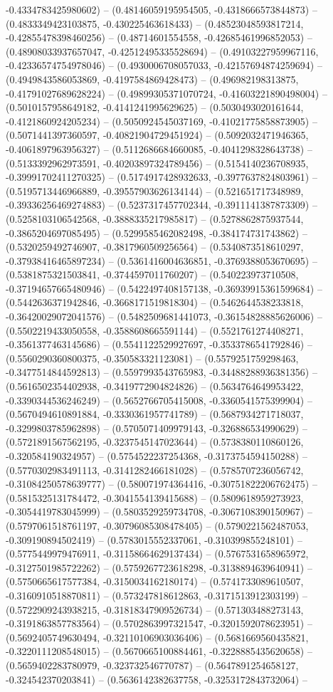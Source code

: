 -0.4334783425980602) -- (0.48146059195954505, -0.4318666573844873) -- (0.4833349423103875, -0.430225463618433) -- (0.48523048593817214, -0.42855478398460256) -- (0.48714601554558, -0.42685461996852053) -- (0.48908033937657047, -0.42512495335528694) -- (0.49103227959967116, -0.42336574754978046) -- (0.4930006708057033, -0.42157694874259694) -- (0.4949843586053869, -0.4197584869428473) -- (0.496982198313875, -0.41791027689628224) -- (0.49899305371070724, -0.41603221890498004) -- (0.5010157958649182, -0.4141241995629625) -- (0.5030493020161644, -0.4121860924205234) -- (0.5050924545037169, -0.41021775858873905) -- (0.5071441397360597, -0.40821904729451924) -- (0.5092032471946365, -0.4061897963956327) -- (0.5112686684660085, -0.4041298328643738) -- (0.5133392962973591, -0.40203897324789456) -- (0.5154140236708935, -0.39991702411270325) -- (0.5174917428932633, -0.3977637824803961) -- (0.5195713446966889, -0.39557903626134144) -- (0.521651717348989, -0.39336256469274883) -- (0.5237317457702344, -0.3911141387873309) -- (0.5258103106542568, -0.3888335217985817) -- (0.5278862875937544, -0.3865204697085495) -- (0.5299585462082498, -0.384174731743862) -- (0.5320259492746907, -0.3817960509256564) -- (0.5340873518610297, -0.37938416465897234) -- (0.5361416004636851, -0.3769388053670695) -- (0.5381875321503841, -0.3744597011760207) -- (0.540223973710508, -0.37194657665480946) -- (0.5422497408157138, -0.36939915361599684) -- (0.5442636371942846, -0.3668171519818304) -- (0.5462644538233818, -0.36420029072041576) -- (0.5482509681441073, -0.36154828885626006) -- (0.5502219433050558, -0.3588608665591144) -- (0.5521761274408271, -0.3561377463145686) -- (0.5541122529927697, -0.3533786541792846) -- (0.5560290360800375, -0.350583321123081) -- (0.5579251759298463, -0.3477514844592813) -- (0.5597993543765983, -0.34488288936381356) -- (0.5616502354402938, -0.3419772904824826) -- (0.5634764649953422, -0.3390344536246249) -- (0.5652766705415008, -0.3360541575399904) -- (0.5670494610891884, -0.3330361957741789) -- (0.5687934271718037, -0.3299803785962898) -- (0.5705071409979143, -0.326886534990629) -- (0.5721891567562195, -0.3237545147023644) -- (0.5738380110860126, -0.320584190324957) -- (0.5754522237254368, -0.3173754594150288) -- (0.5770302983491113, -0.3141282466181028) -- (0.5785707236056742, -0.31084250578639777) -- (0.580071974364416, -0.30751822206762475) -- (0.5815325131784472, -0.3041554139415688) -- (0.5809618959273923, -0.3054419783045999) -- (0.5803529259734708, -0.3067108390150967) -- (0.5797061518761197, -0.30796085308478405) -- (0.5790221562487053, -0.309190894502419) -- (0.5783015552337061, -0.310399855248101) -- (0.5775449979476911, -0.31158664629137434) -- (0.5767531658965972, -0.3127501985722262) -- (0.5759267723618298, -0.3138894639640941) -- (0.5750665617577384, -0.3150034162180174) -- (0.5741733089610507, -0.3160910518870811) -- (0.573247818612863, -0.3171513912303199) -- (0.5722909243938215, -0.31818347909526734) -- (0.571303488273143, -0.3191863857783564) -- (0.5702863997321547, -0.3201592078623951) -- (0.5692405749630494, -0.32110106903036406) -- (0.5681669560435821, -0.3220111208548015) -- (0.5670665100884461, -0.3228885435620658) -- (0.5659402283780979, -0.323732546770787) -- (0.5647891254658127, -0.324542370203841) -- (0.5636142382637758, -0.3253172843732064) -- 